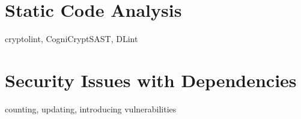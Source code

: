 
\section{Static Code Analysis}\label{sec:related-work:static-code-analysis}

cryptolint, CogniCryptSAST, DLint \cite{egele2013, kruger2018, gong2015, smith2020, gabet2020}



\section{Security Issues with Dependencies}\label{sec:related-work:dependency-issues}

counting, updating, introducing vulnerabilities \cite{xia2014, mirhosseini2017, kula2017, watanabe2017, pashchenko2018}


